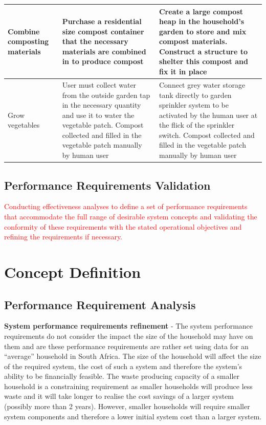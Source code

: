 \documentclass[a4paper,11pt,fleqn]{report}
\begin{document}
\begin{table}[h!]
\begin{center}
\begin{tabular}{p{3.5cm}|p{6cm}|p{6cm}}
    \hline
     Combine composting materials & Purchase a residential size compost container that the necessary materials are combined in to produce compost & Create a large compost heap in the household's garden to store and mix compost materials. Construct a structure to shelter this compost and fix it in place\\
    \hline
     Grow vegetables & User must collect water from the outside garden tap in the necessary quantity and use it to water the vegetable patch. Compost collected and filled in the vegetable patch manually by human user & Connect grey water storage tank directly to garden sprinkler system to be activated by the human user at the flick of the sprinkler switch. Compost collected and filled in the vegetable patch manually by human user\\
    \hline
    \bottomrule
\end{tabular}
\end{center}
\end{table}
%
	
\subsection{Performance Requirements Validation}
\textcolor{red}{Conducting effectiveness analyses to define a set of performance requirements that accommodate the full range of desirable system concepts and validating the conformity of these requirements with the stated operational objectives and refining the requirements if necessary.}

\section{Concept Definition}
\subsection{Performance Requirement Analysis}
\textbf{System performance requirements refinement} - The system performance requirements do not consider the impact the size of the household may have on them and are these performance requirements are rather set using data for an “average” household in South Africa. The size of the household will affect the size of the required system, the cost of such a system and therefore the system’s ability to be financially feasible. The waste producing capacity of a smaller household is a constraining requirement as smaller households will produce less waste and it will take longer to realise the cost savings of a larger system (possibly more than 2 years). However, smaller households will require smaller system components and therefore a lower initial system cost than a larger system.
\end{document}
